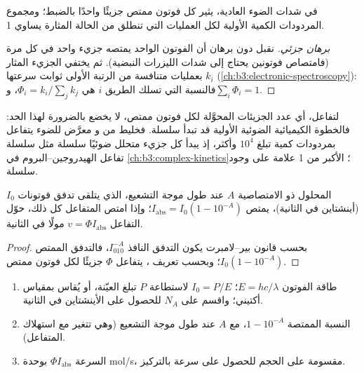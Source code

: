 \begin{proposition}\label{prop:b3:photochemistry:stark-einstein}
في شدات الضوء العادية، يثير كل فوتون ممتص جزيئًا واحدًا
بالضبط؛ ومجموع المردودات الكمية الأولية لكل العمليات التي تنطلق من
الحالة المثارة يساوي 1.
\end{proposition}

\begin{proof}[برهان جزئي]
نقبل دون برهان أن الفوتون الواحد يمتصه جزيء واحد في كل مرة (فامتصاص
فوتونين يحتاج إلى شدات الليزرات النبضية). ثم يختفي الجزيء المثار
بعمليات متنافسة من الرتبة الأولى ثوابت سرعتها $k_i$
(\cref{ch:b3:electronic-spectroscopy}): فالنسبة التي تسلك الطريق $i$ هي $\Phi_i =
k_i/\sum_jk_j$، و$\sum_i\Phi_i = 1$.
\end{proof}

 لتفاعل، أي عدد الجزيئات المحوَّلة لكل فوتون
ممتص، لا يخضع بالضرورة لهذا الحد: فالخطوة الكيميائية الضوئية الأولية قد تبدأ
سلسلة. فخليط من  و معرَّض للضوء يتفاعل بمردودات كمية
تبلغ $10^4$ وأكثر، إذ يبدأ كل جزيء  متحلل ضوئيًا سلسلة مثل سلسلة
تفاعل الهيدروجين--البروم في \cref{ch:b3:complex-kinetics}؛ 
الأكبر من 1 علامة على وجود سلسلة.

\begin{proposition}\label{prop:b3:photochemistry:rate}
المحلول ذو الامتصاصية $A$ عند طول موجة التشعيع، الذي يتلقى تدفق فوتونات
$I_0$ (أينشتاين في الثانية)، يمتص $I_{\mathrm{abs}} = I_0(1 - 10^{-A})$؛ وإذا
امتص المتفاعل كل ذلك، حوّل التفاعل $v = \Phi I_{\mathrm{abs}}$ مولًا في الثانية.
\end{proposition}

\begin{proof}
بحسب قانون بير--لامبرت يكون التدفق النافذ $I_010^{-A}$، فالتدفق الممتص
$I_0(1 - 10^{-A})$؛ وبحسب تعريف ، يتفاعل $\Phi$ جزيئًا لكل
فوتون ممتص.
\end{proof}

\begin{method}\label{met:b3:photochemistry:photochemical-rate}
\begin{enumerate}
  \item طاقة الفوتون $E = hc/\lambda$؛  $I_0 = P/E$ لاستطاعة $P$ تبلغ
        العيّنة، أو يُقاس بمقياس أكتيني؛ واقسم على $N_A$ للحصول على الأينشتاين في
        الثانية.
  \item النسبة الممتصة $1 - 10^{-A}$، مع $A$ عند طول موجة التشعيع (وهي
        تتغير مع استهلاك المتفاعل).
  \item السرعة $\Phi I_{\mathrm{abs}}$ بوحدة mol/s، مقسومة على الحجم للحصول على سرعة بالتركيز.
\end{enumerate}
\end{method}

